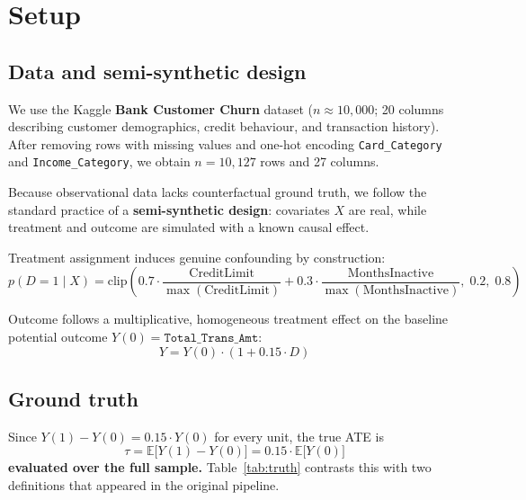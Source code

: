 \documentclass[11pt]{article}
\begin{document}
\section{Setup}

\subsection{Data and semi-synthetic design}

We use the Kaggle \textbf{Bank Customer Churn} dataset ($n \approx 10{,}000$; 20 columns describing customer demographics, credit behaviour, and transaction history). After removing rows with missing values and one-hot encoding \texttt{Card\_Category} and \texttt{Income\_Category}, we obtain $n = 10{,}127$ rows and 27 columns.

Because observational data lacks counterfactual ground truth, we follow the standard practice of a \textbf{semi-synthetic design}: covariates $X$ are real, while treatment and outcome are simulated with a known causal effect.

Treatment assignment induces genuine confounding by construction:
\begin{equation}
p(D=1 \mid X) = \mathrm{clip}\!\left(0.7 \cdot \frac{\text{CreditLimit}}{\max(\text{CreditLimit})} + 0.3 \cdot \frac{\text{MonthsInactive}}{\max(\text{MonthsInactive})},\; 0.2,\; 0.8\right)
\end{equation}

Outcome follows a multiplicative, homogeneous treatment effect on the baseline potential outcome $Y(0) = \texttt{Total\_Trans\_Amt}$:
\begin{equation}
Y = Y(0) \cdot (1 + 0.15 \cdot D)
\end{equation}

\subsection{Ground truth}

Since $Y(1) - Y(0) = 0.15 \cdot Y(0)$ for every unit, the true ATE is
\begin{equation}
\tau = \mathbb{E}\bigl[Y(1) - Y(0)\bigr] = 0.15 \cdot \mathbb{E}\bigl[Y(0)\bigr]
\end{equation}
\textbf{evaluated over the full sample.} Table~\ref{tab:truth} contrasts this with two definitions that appeared in the original pipeline.
\end{document}
